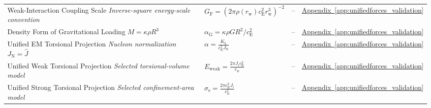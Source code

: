\begin{longtable}{@{} p{4.5cm} p{6cm} c p{4cm} @{}}
{\raggedright Weak-Interaction Coupling Scale \newline \textit{Inverse-square energy-scale convention}\par} & {\raggedright $G_{\mathrm{F}} = (2\pi \rho(r_{\mathrm{w}}) c_{\mathrm{E}}^2 r_{\mathrm{w}}^3)^{-2}$\par} & -- & {\raggedright \hyperref[app:unifiedforces_validation]{Appendix~\ref*{app:unifiedforces_validation}}\par} \\

{\raggedright Density Form of Gravitational Loading \newline \textit{$M=\kappa\rho R^3$}\par} & {\raggedright $\alpha_{\mathrm G}=\kappa\rho G R^2/c_{\mathrm E}^2$\par} & -- & {\raggedright \hyperref[app:unifiedforces_validation]{Appendix~\ref*{app:unifiedforces_validation}}\par} \\

{\raggedright Unified EM Torsional Projection \newline \textit{Nucleon normalization $J_{\mathrm N}=\widehat J$}\par} & {\raggedright $\alpha = \frac{K_{\mathrm{L}}}{c_{\mathrm{E}}^2 J_{\mathrm{N}}}$\par} & -- & {\raggedright \hyperref[app:unifiedforces_validation]{Appendix~\ref*{app:unifiedforces_validation}}\par} \\

{\raggedright Unified Weak Torsional Projection \newline \textit{Selected torsional-volume model}\par} & {\raggedright $E_{\mathrm{weak}} = \frac{2\pi J_i c_{\mathrm{E}}^2}{r_{\mathrm{w}}}$\par} & -- & {\raggedright \hyperref[app:unifiedforces_validation]{Appendix~\ref*{app:unifiedforces_validation}}\par} \\

{\raggedright Unified Strong Torsional Projection \newline \textit{Selected confinement-area model}\par} & {\raggedright $\sigma_{\mathrm{s}} = \frac{2\pi c_{\mathrm{E}}^2 J_i}{r_{\mathrm{N}}^2}$\par} & -- & {\raggedright \hyperref[app:unifiedforces_validation]{Appendix~\ref*{app:unifiedforces_validation}}\par} \\


\end{longtable}
